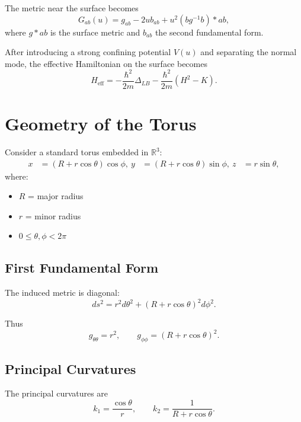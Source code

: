 \documentclass[11pt]{article}
\begin{document}
The metric near the surface becomes
\begin{equation}
G_{ab}(u) = g_{ab} - 2u b_{ab} + u^2 (b g^{-1} b)*{ab},
\end{equation}
where $g*{ab}$ is the surface metric and $b_{ab}$ the second fundamental form.

After introducing a strong confining potential $V(u)$ and separating the normal mode, the effective Hamiltonian on the surface becomes
\begin{equation}
H_{\text{eff}} = -\frac{\hbar^2}{2m}\Delta_{LB} - \frac{\hbar^2}{2m}(H^2 - K).
\end{equation}

\section{Geometry of the Torus}

Consider a standard torus embedded in $\mathbb{R}^3$:
\begin{equation}
\begin{aligned}
x &= (R + r \cos\theta) \cos\phi, \
y &= (R + r \cos\theta) \sin\phi, \
z &= r \sin\theta,
\end{aligned}
\end{equation}
where:
\begin{itemize}
\item $R$ = major radius
\item $r$ = minor radius
\item $0 \le \theta, \phi < 2\pi$
\end{itemize}

\subsection{First Fundamental Form}

The induced metric is diagonal:
\begin{equation}
ds^2 = r^2 d\theta^2 + (R + r \cos\theta)^2 d\phi^2.
\end{equation}

Thus
\begin{equation}
g_{\theta\theta} = r^2, \qquad g_{\phi\phi} = (R + r\cos\theta)^2.
\end{equation}

\subsection{Principal Curvatures}

The principal curvatures are
\begin{equation}
k_1 = \frac{\cos\theta}{r},
\qquad
k_2 = \frac{1}{R + r \cos\theta}.
\end{equation}
\end{document}
